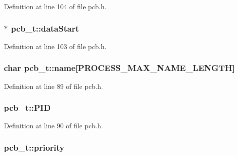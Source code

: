 Definition at line 104 of file pcb.\+h.

\subsubsection[{\texorpdfstring{data\+Start}{dataStart}}]{$\ast$ pcb\+\_\+t\+::data\+Start}\hypertarget{structs__pcb__stuct_ac5d905bfc91bb5364487b48fe06a7fc2}{}\label{structs__pcb__stuct_ac5d905bfc91bb5364487b48fe06a7fc2}


Definition at line 103 of file pcb.\+h.

\subsubsection[{\texorpdfstring{name}{name}}]{\setlength{\rightskip}{0pt plus 5cm}char pcb\+\_\+t\+::name\mbox{[}{\bf P\+R\+O\+C\+E\+S\+S\+\_\+\+M\+A\+X\+\_\+\+N\+A\+M\+E\+\_\+\+L\+E\+N\+G\+TH}\mbox{]}}\hypertarget{structs__pcb__stuct_a35c285b13db8c228686d0f8a6757df55}{}\label{structs__pcb__stuct_a35c285b13db8c228686d0f8a6757df55}


Definition at line 89 of file pcb.\+h.

\subsubsection[{\texorpdfstring{P\+ID}{PID}}]{ pcb\+\_\+t\+::\+P\+ID}\hypertarget{structs__pcb__stuct_adb2bb17e9c8a673c566b6ca4abae4c3d}{}\label{structs__pcb__stuct_adb2bb17e9c8a673c566b6ca4abae4c3d}


Definition at line 90 of file pcb.\+h.

\subsubsection[{\texorpdfstring{priority}{priority}}]{ pcb\+\_\+t\+::priority}\hypertarget{structs__pcb__stuct_a55fc1faff03a8b63cf31bb2bfa23bdb3}{}\label{structs__pcb__stuct_a55fc1faff03a8b63cf31bb2bfa23bdb3}


